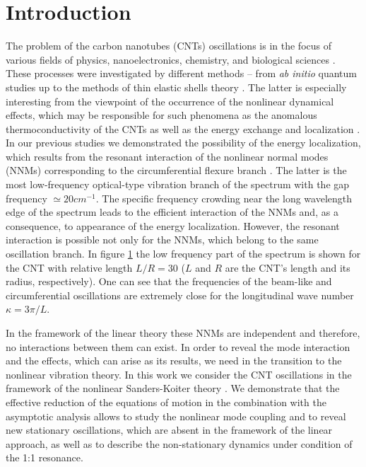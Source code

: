 \section{Introduction}\label{Int}
The problem of the carbon nanotubes (CNTs) oscillations is in the focus of various fields of  physics, nanoelectronics, chemistry, and biological sciences \cite{CLi03,Sazonova2004,Anantram06}.
These processes were investigated by different methods -- from \textit{ab initio} quantum studies up to the methods of thin elastic shells theory \cite{Mahan02,CYWang04,Silvestre11}.
The latter is especially interesting from the viewpoint of the occurrence of the nonlinear dynamical effects, which may be responsible for such phenomena as the anomalous thermoconductivity of the CNTs \cite{Berber00,Mingo05,Wang06} as well as the energy exchange and localization \cite{Smirnov2014,Smirnov2016PhysD}.
In our previous studies we demonstrated the possibility of the energy localization, which results from the resonant interaction of the nonlinear normal modes (NNMs) corresponding to the circumferential flexure branch \cite{Smirnov2014,Smirnov2016PhysD}.
The latter is the most low-frequency optical-type vibration branch of the spectrum with the gap frequency $\simeq 20 cm^{-1}$.
The specific frequency crowding near the long wavelength edge of the spectrum leads to the efficient interaction of the NNMs and, as a consequence, to appearance of the energy localization.
However, the resonant interaction is possible not only for the NNMs, which belong to the same oscillation branch.
In  figure \ref{fig:spectr0} the low frequency part of the spectrum is shown for the CNT with relative length $L/R=30$ ($L$ and $R$ are the CNT's length and its radius, respectively).
One can see that the frequencies of the beam-like and circumferential oscillations are extremely close for the longitudinal wave number $\kappa=3 \pi /L$.

\begin{figure}
\label{fig:spectr0}
\end{figure}

In the framework of the linear theory these NNMs are independent and therefore, no interactions between them can exist.
In order to reveal the mode interaction and the effects, which can arise as its results, we need in the transition to the nonlinear vibration theory.
In this work we consider the CNT oscillations in the framework of the nonlinear Sanders-Koiter theory \cite{Amabili08}.
We demonstrate that the effective reduction of the equations of motion in the combination with the asymptotic analysis allows to study the nonlinear mode coupling and to reveal new stationary oscillations, which are absent in the framework of the linear approach, as well as to describe the non-stationary dynamics under condition of the 1:1 resonance.

